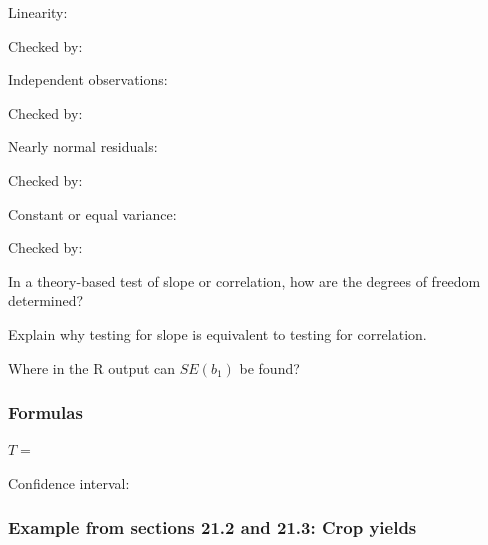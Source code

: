 \documentclass[
]{report}
\newcommand{\rgs}{\vspace{12pt}} %
\newcommand{\rgi}{\hspace{24pt}}  %
\begin{document}
\rgi Linearity:
\rgs

\rgi \rgi Checked by:
\rgs

\rgi Independent observations:
\rgs

\rgi \rgi Checked by:
\rgs

\rgi Nearly normal residuals:
\rgs

\rgi \rgi Checked by:
\rgs

\rgi Constant or equal variance:
\rgs

\rgi \rgi Checked by:
\rgs

In a theory-based test of slope or correlation, how are the degrees of freedom determined?
\rgs    

Explain why testing for slope is equivalent to testing for correlation.
\rgs

Where in the R output can \(SE(b_1)\) be found?
\rgs

\hypertarget{formulas-4}{%
\subsubsection*{Formulas}\label{formulas-4}}

\(T=\)
\rgs

Confidence interval:
\rgs

\hypertarget{example-from-sections-21.2-and-21.3-crop-yields}{%
\subsubsection*{Example from sections 21.2 and 21.3: Crop yields}\label{example-from-sections-21.2-and-21.3-crop-yields}}
\end{document}
